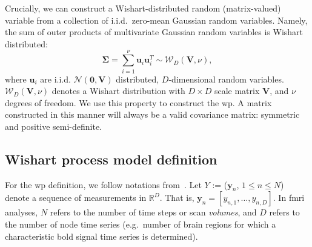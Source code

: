 Crucially, we can construct a Wishart-distributed random (matrix-valued) variable from a collection of i.i.d.~zero-mean Gaussian random variables.
Namely, the sum of outer products of multivariate Gaussian random variables is Wishart distributed:
\begin{equation}
  \mathbf{\Sigma} = \sum_{i=1}^\nu \textbf{u}_i \textbf{u}_i^T \sim \mathcal{W}_D(\mathbf{V}, \nu),
  \label{eq:wishart-from-iid-gaussians}
\end{equation}
where $\textbf{u}_i$ are i.i.d. $\mathcal{N}(\textbf{0}, \mathbf{V})$ distributed, $D$-dimensional random variables.
$\mathcal{W}_D(\mathbf{V}, \nu)$ denotes a Wishart distribution with $D \times D$ scale matrix $\mathbf{V}$, and $\nu$ degrees of freedom.
We use this property to construct the \gls{wp}.
A matrix constructed in this manner will always be a valid covariance matrix: symmetric and positive semi-definite.

\subsection{Wishart process model definition}

For the \gls{wp} definition, we follow notations from~\textcite{Heaukulani2019}.
Let $Y$ := ($\mathbf{y}_n$, $1 \leq n \leq N$) denote a sequence of measurements in $\mathbb{R}^D$.
That is, $\mathbf{y}_n = [y_{n,1}, \dots, y_{n,D}]$.
In \gls{fmri} analyses, $N$ refers to the number of time steps or scan \emph{volumes}, and $D$ refers to the number of node time series (e.g.~number of brain regions for which a characteristic \gls{bold} signal time series is determined).

